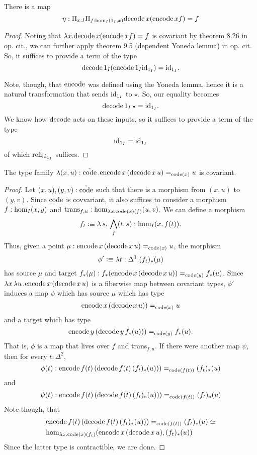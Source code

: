 \documentclass[main.tex]{subfiles}
\begin{document}
\begin{lemma}
    There is a map 
    $$ \eta : \Pi_{x : I} \Pi_{f : \ho[I]{1_I}{x}} \normalfont \dco \, x (\eco \, x f) = f$$
\end{lemma}
\begin{proof}
Noting that $\lambda x .\dco \, x (\eco \, x f) = f$ is covariant by theorem 8.26 in op. cit., we can further apply theorem 9.5 (dependent Yoneda lemma) in op. cit. So, it suffices to provide a term of the type
$$\dco \, 1_I (\eco \, 1_I \id{1_I}) = \id{1_I}.$$

Note, though, that $\eco$ was defined using the Yoneda lemma, hence it is a natural transformation that sends $\id{1_I}$ to $\star$. So, our equality becomes $$
\dco \, 1_I \, \star = \id{1_I}.$$ We know how $\dco$ acts on these inputs, so it suffices to provide a term of the type
$$\id{1_I} = \id{1_I}$$
of which $\refl{\id{1_I}}$ suffices.
\end{proof}
\begin{lemma}
    The type family $\normalfont \lambda (x,u) : \tilde{\co}\,. \eco \, x \, (\dco \, x \,u)=_{\co(x)} u$ is covariant.
\end{lemma}
\begin{proof}
    Let $(x,u),(y,v) : \tilde{\co}$ such that there is a morphism from $(x,u)$ to $(y,v)$. Since $\co$ is covvariant, it also suffices to consider a morphism $f : \ho[I]{x}{y}$ and $\text{trans}_{f,u} : \ho[\lambda x. \co(x)(f)]{u}{v}$.
    We can define a morphism $$f_t \defeq \lambda \,s . \, \bigwedge_f(t,s) : \ho[I]{x}{f(t)}.$$
    Thus, given a point $\mu : \eco \, x \, (\dco \, x \,u)=_{\co(x)} u$, the morphism $$\phi' \defeq \lambda t : \Delta^1. (f_t)_*(\mu)$$ has source $\mu$ and target $f_*(\mu): f_*(\eco \, x \, (\dco \, x \,u)) =_{\co(y)} f_*(u)$. 
    Since $\lambda x\, \lambda u \,. \eco \, x \, (\dco \, x \,u)$ is a fiberwise map between covariant types, $\phi'$ induces a map $\phi$ which has source $\mu$ which has type $$\eco \, x \, (\dco \, x \,u)) =_{\co(x)} u$$ and a target which has type $$\eco \, y \, (\dco \, y \,f_*(u))) =_{\co(y)} f_*(u).$$
    That is, $\phi$ is a map that lives over $f$ and trans$_{f,u}$.
    If there were another map $\psi$, then for every $t : \Delta^2$, $$\phi(t) : \eco \, f(t) \, (\dco \, f(t) \,(f_t)_*(u))) =_{\co(f(t))} (f_t)_*(u)$$
    and
    $$\psi(t) : \eco \, f(t) \, (\dco \, f(t) \,(f_t)_*(u))) =_{\co(f(t))} (f_t)_*(u)$$
    Note though, that 
    \begin{align*}
        &\eco \, f(t) \, (\dco \, f(t) \,(f_t)_*(u))) =_{\co(f(t))} (f_t)_*(u) \simeq \\
        &\ho[\lambda x.\co(x)(f_t)]{ \eco \, x \, (\dco \, x \,u)}{ (f_t)_*(u)}
    \end{align*}
    Since the latter type is contractible, we are done.
\end{proof}
\end{document}
